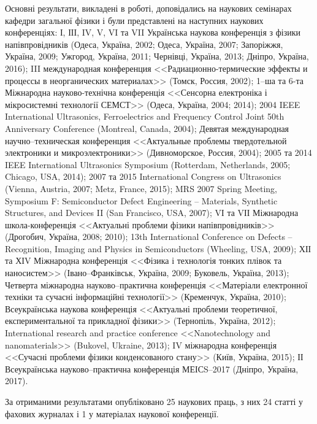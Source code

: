{\probationTXT}
Основні результати, викладені в роботі, доповідались на наукових семінарах
кафедри загальної фізики \thesisOfOrganization
і були представлені на наступних наукових конференціях:
І, ІІІ, IV, V, VI та VII Українська наукова конференція з фізики напівпровідників
(Одеса, Україна, 2002; Одеса, Україна, 2007; Запоріжжя, Україна, 2009;
Ужгород, Україна, 2011; Чернівці, Україна, 2013; Дніпро, Україна, 2016);
III международная конференция <<Радиационно-термические эффекты и процессы в неорганических материалах>> (Томск, Россия, 2002);
1--ша та 6-та Міжнародна науково-технічна конференція <<Сенсорна електроніка і мікросистемні технології СЕМСТ>> (Одеса, Україна, 2004; 2014);
2004 IEEE International Ultrasonics, Ferroelectrics and Frequency Control Joint 50th Anniversary Conference (Montreal, Canada, 2004);
Девятая международная научно--техническая конференция <<Актуальные проблемы твердотельной электроники и микроэлектроники>> (Дивноморское, Россия, 2004);
2005 та 2014 IEEE International Ultrasonics Symposium (Rotterdam, Netherlands, 2005; Chicago, USA, 2014);
2007 та 2015 International Congress on Ultrasonics (Vienna, Austria, 2007; Metz, France, 2015);
MRS 2007 Spring Meeting, Symposium F: Semiconductor Defect Engineering -- Materials, Synthetic Structures, and Devices II (San Francisco, USA, 2007);
VІ та VІІ Міжнародна школа-конференція <<Актуальні проблеми фізики напівпровідників>> (Дрогобич, Україна, 2008; 2010);
13th International Conference on Defects – Recognition, Imaging and Physics in Semiconductors (Wheeling, USA, 2009);
ХІІ та ХІV Міжнародна конференція <<Фізика і технологія тонких плівок та наносистем>> (Івано--Франківськ, Україна, 2009; Буковель, Україна, 2013);
Четверта міжнародна науково--практична конференція <<Матеріали електронної техніки та сучасні інформаційні технології>> (Кременчук, Україна, 2010);
Всеукраїнська наукова конференція <<Актуальні проблеми теоретичної, експериментальної та прикладної фізики>> (Тернопіль, Україна, 2012);
International research and practice conference <<Nanotechnology and nanomaterials>> (Bukovel, Ukraine, 2013);
IV міжнародна конференція <<Сучасні проблеми фізики конденсованого стану>> (Київ, Україна, 2015);
ІІ Всеукраїнська науково--практична конференція МЕІСS--2017 (Дніпро, Україна, 2017).

{\publicationsTXT}
За отриманими результатами опубліковано 25 наукових праць,
з них 24 статті у фахових журналах і 1 у матеріалах наукової конференції.



